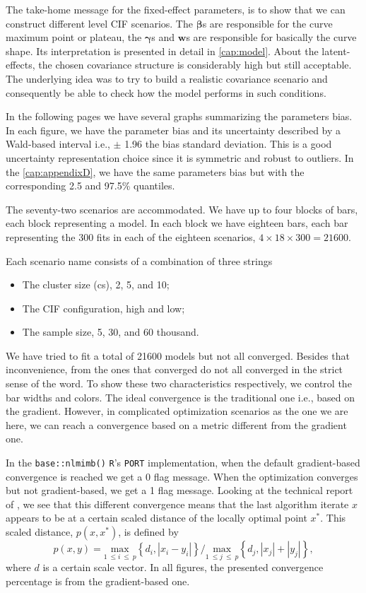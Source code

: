 The take-home message for the fixed-effect parameters, is to show that
we can construct different level CIF scenarios. The \(\bm{\beta}\)s are
responsible for the curve maximum point or plateau, the \(\bm{\gamma}\)s
and \(\bm{w}\)s are responsible for basically the curve shape. Its
interpretation is presented in detail in \autoref{cap:model}. About the
latent-effects, the chosen covariance structure is considerably high but
still acceptable. The underlying idea was to try to build a realistic
covariance scenario and consequently be able to check how the model
performs in such conditions.

In the following pages we have several graphs summarizing the parameters
bias. In each figure, we have the parameter bias and its uncertainty
described by a Wald-based interval i.e., \(\pm\) 1.96 the bias standard
deviation. This is a good uncertainty representation choice since it is
symmetric and robust to outliers. In the \autoref{cap:appendixD}, we
have the same parameters bias but with the corresponding 2.5 and 97.5\%
quantiles.

The seventy-two scenarios are accommodated. We have up to four blocks of
bars, each block representing a model. In each block we have eighteen
bars, each bar representing the 300 fits in each of the eighteen
scenarios, \(4 \times 18 \times 300 = 21600\). 

Each scenario name consists of a combination of three strings
\begin{itemize}
 \item The cluster size (cs), 2, 5, and 10;
 \item The CIF configuration, high and low;
 \item The sample size, 5, 30, and 60 thousand.
\end{itemize}
We have tried to fit a total of 21600 models but not all
converged. Besides that inconvenience, from the ones that converged do
not all converged in the strict sense of the word. To show these two
characteristics respectively, we control the bar widths and colors. The
ideal convergence is the traditional one i.e., based on the
gradient. However, in complicated optimization scenarios as the one we
are here, we can reach a convergence based on a metric different from
the gradient one.

In the \texttt{base::nlmimb()} \texttt{R}'s \texttt{PORT}
implementation, when the default gradient-based convergence is reached
we get a 0 flag message. When the optimization converges but not
gradient-based, we get a 1 flag message. Looking at the technical report
of , we see that this different convergence means
that the last algorithm iterate \(x\) appears to be at a certain scaled
distance of the locally optimal point \(x^{\ast}\). This scaled
distance, \(p(x, x^{\ast})\), is defined by
\[
 p(x, y) =
 \underset{1~\leq i~\leq~p}{\text{max}}
 \left\{d_{i}, |x_{i} - y_{i}|\right\}
 \Big/
 \underset{1~\leq j~\leq~p}{\text{max}}
 \left\{d_{j}, |x_{j}| + |y_{j}|\right\},
\]
where \(d\) is a certain scale vector. In all figures, the presented
convergence percentage is from the gradient-based one.

